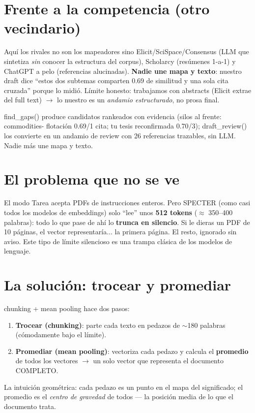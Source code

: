 \documentclass[11pt,a4paper]{article}
\begin{document}
\section{Frente a la competencia (otro vecindario)}

Aquí los rivales no son los mapeadores sino Elicit/SciSpace/Consensus (LLM que sintetiza
\emph{sin} conocer la estructura del corpus), Scholarcy (resúmenes 1-a-1) y ChatGPT a pelo
(referencias alucinadas). \textbf{Nadie une mapa y texto}: nuestro draft dice ``estos dos
subtemas comparten 0.69 de similitud y una sola cita cruzada'' porque lo midió. Límite
honesto: trabajamos con abstracts (Elicit extrae del full text) $\rightarrow$ lo nuestro es
un \emph{andamio estructurado}, no prosa final.

\begin{resumen}
find\_gaps() produce candidatos rankeados con evidencia (silos al frente: commodities-
flotación 0.69/1 cita; tu tesis reconfirmada 0.70/3); draft\_review() los convierte en un
andamio de review con 26 referencias trazables, sin LLM. Nadie más une mapa y texto.
\end{resumen}
\clearpage
{}
{}

\section{El problema que no se ve}

El modo Tarea acepta PDFs de instrucciones enteros. Pero SPECTER (como casi todos los
modelos de embeddings) solo ``lee'' unos \textbf{512 tokens} ($\approx$ 350--400 palabras):
todo lo que pase de ahí lo \textbf{trunca en silencio}. Si le dieras un PDF de 10 páginas,
el vector representaría... la primera página. El resto, ignorado sin aviso. Este tipo de
límite silencioso es una trampa clásica de los modelos de lenguaje.

\section{La solución: trocear y promediar}

\begin{concepto}{chunking + mean pooling}
 hace dos pasos:
\begin{enumerate}
  \item \textbf{Trocear (chunking)}: parte cada texto en pedazos de $\sim$180 palabras
        (cómodamente bajo el límite).
  \item \textbf{Promediar (mean pooling)}: vectoriza cada pedazo y calcula el
        \textbf{promedio} de todos los vectores $\rightarrow$ un solo vector que representa
        el documento COMPLETO.
\end{enumerate}
La intuición geométrica: cada pedazo es un punto en el mapa del significado; el promedio es
el \emph{centro de gravedad} de todos — la posición media de lo que el documento trata.
\end{concepto}
\end{document}
